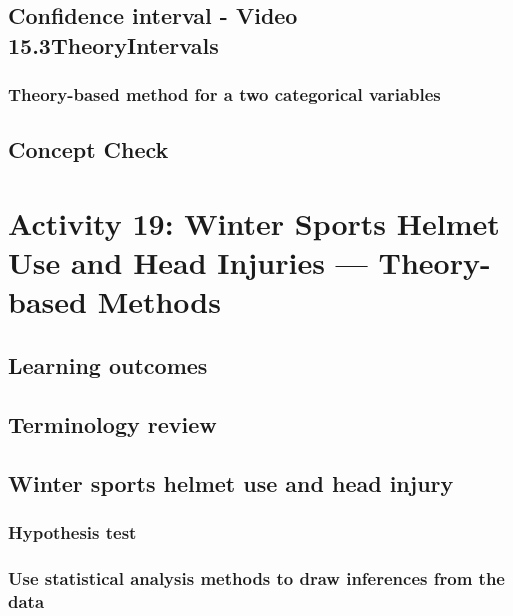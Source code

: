 \documentclass[
]{report}
\begin{document}
\subsection*{Confidence interval - Video 15.3TheoryIntervals}\label{confidence-interval---video-15.3theoryintervals}

\subsubsection*{Theory-based method for a two categorical variables}\label{theory-based-method-for-a-two-categorical-variables}

\subsection{Concept Check}\label{concept-check-8}

\section{Activity 19: Winter Sports Helmet Use and Head Injuries --- Theory-based Methods}\label{activity-19-winter-sports-helmet-use-and-head-injuries-theory-based-methods}

\subsection{Learning outcomes}\label{learning-outcomes-20}

\subsection{Terminology review}\label{terminology-review-17}

\subsection{Winter sports helmet use and head injury}\label{winter-sports-helmet-use-and-head-injury}

\subsubsection*{Hypothesis test}\label{hypothesis-test-2}

\subsubsection*{Use statistical analysis methods to draw inferences from the data}\label{use-statistical-analysis-methods-to-draw-inferences-from-the-data-3}
\end{document}
